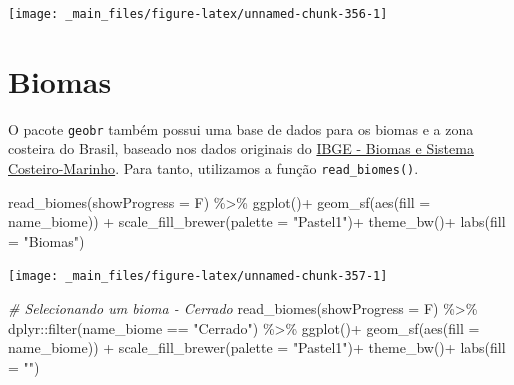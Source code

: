 \documentclass[
  brazilian,
]{book}
\newenvironment{Shaded}{\begin{snugshade}}{\end{snugshade}}
\newcommand{\AttributeTok}[1]{\textcolor[rgb]{0.77,0.63,0.00}{#1}}
\newcommand{\CommentTok}[1]{\textcolor[rgb]{0.56,0.35,0.01}{\textit{#1}}}
\newcommand{\FunctionTok}[1]{\textcolor[rgb]{0.00,0.00,0.00}{#1}}
\newcommand{\NormalTok}[1]{#1}
\newcommand{\SpecialCharTok}[1]{\textcolor[rgb]{0.00,0.00,0.00}{#1}}
\newcommand{\StringTok}[1]{\textcolor[rgb]{0.31,0.60,0.02}{#1}}
\begin{document}
\begin{center}\texttt{[image: \_main\_files/figure-latex/unnamed-chunk-356-1]} \end{center}

\hypertarget{biomas}{%
\section{Biomas}\label{biomas}}

O pacote \texttt{geobr} também possui uma base de dados para os biomas e a zona costeira do Brasil, baseado nos dados originais do \href{https://www.ibge.gov.br/apps/biomas/\#/home}{IBGE - Biomas e Sistema Costeiro-Marinho}. Para tanto, utilizamos a função \texttt{read\_biomes()}.

\begin{Shaded}
\begin{Highlighting}[]
\FunctionTok{read\_biomes}\NormalTok{(}\AttributeTok{showProgress =}\NormalTok{ F) }\SpecialCharTok{\%\textgreater{}\%} 
  \FunctionTok{ggplot}\NormalTok{()}\SpecialCharTok{+}
  \FunctionTok{geom\_sf}\NormalTok{(}\FunctionTok{aes}\NormalTok{(}\AttributeTok{fill =}\NormalTok{ name\_biome)) }\SpecialCharTok{+}
  \FunctionTok{scale\_fill\_brewer}\NormalTok{(}\AttributeTok{palette =} \StringTok{"Pastel1"}\NormalTok{)}\SpecialCharTok{+}
  \FunctionTok{theme\_bw}\NormalTok{()}\SpecialCharTok{+}
  \FunctionTok{labs}\NormalTok{(}\AttributeTok{fill =} \StringTok{"Biomas"}\NormalTok{)}
\end{Highlighting}
\end{Shaded}

\begin{center}\texttt{[image: \_main\_files/figure-latex/unnamed-chunk-357-1]} \end{center}

\begin{Shaded}
\begin{Highlighting}[]
\CommentTok{\# Selecionando um bioma {-} Cerrado}
\FunctionTok{read\_biomes}\NormalTok{(}\AttributeTok{showProgress =}\NormalTok{ F) }\SpecialCharTok{\%\textgreater{}\%} 
\NormalTok{  dplyr}\SpecialCharTok{::}\FunctionTok{filter}\NormalTok{(name\_biome }\SpecialCharTok{==} \StringTok{"Cerrado"}\NormalTok{) }\SpecialCharTok{\%\textgreater{}\%} 
  \FunctionTok{ggplot}\NormalTok{()}\SpecialCharTok{+}
  \FunctionTok{geom\_sf}\NormalTok{(}\FunctionTok{aes}\NormalTok{(}\AttributeTok{fill =}\NormalTok{ name\_biome)) }\SpecialCharTok{+}
  \FunctionTok{scale\_fill\_brewer}\NormalTok{(}\AttributeTok{palette =} \StringTok{"Pastel1"}\NormalTok{)}\SpecialCharTok{+}
  \FunctionTok{theme\_bw}\NormalTok{()}\SpecialCharTok{+}
  \FunctionTok{labs}\NormalTok{(}\AttributeTok{fill =} \StringTok{""}\NormalTok{)}
\end{Highlighting}
\end{Shaded}
\end{document}

